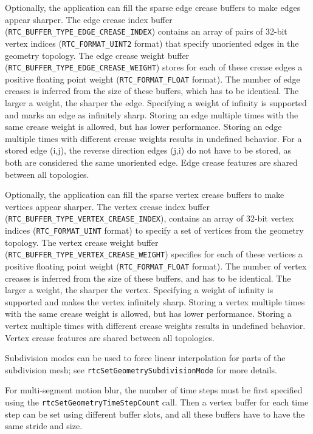 Optionally, the application can fill the sparse edge crease buffers to
make edges appear sharper. The edge crease index buffer
(\texttt{RTC\_BUFFER\_TYPE\_EDGE\_CREASE\_INDEX}) contains an array of
pairs of 32-bit vertex indices (\texttt{RTC\_FORMAT\_UINT2} format) that
specify unoriented edges in the geometry topology. The edge crease
weight buffer (\texttt{RTC\_BUFFER\_TYPE\_EDGE\_CREASE\_WEIGHT}) stores
for each of these crease edges a positive floating point weight
(\texttt{RTC\_FORMAT\_FLOAT} format). The number of edge creases is
inferred from the size of these buffers, which has to be identical. The
larger a weight, the sharper the edge. Specifying a weight of infinity
is supported and marks an edge as infinitely sharp. Storing an edge
multiple times with the same crease weight is allowed, but has lower
performance. Storing an edge multiple times with different crease
weights results in undefined behavior. For a stored edge (i,j), the
reverse direction edges (j,i) do not have to be stored, as both are
considered the same unoriented edge. Edge crease features are shared
between all topologies.

Optionally, the application can fill the sparse vertex crease buffers to
make vertices appear sharper. The vertex crease index buffer
(\texttt{RTC\_BUFFER\_TYPE\_VERTEX\_CREASE\_INDEX}), contains an array
of 32-bit vertex indices (\texttt{RTC\_FORMAT\_UINT} format) to specify
a set of vertices from the geometry topology. The vertex crease weight
buffer (\texttt{RTC\_BUFFER\_TYPE\_VERTEX\_CREASE\_WEIGHT}) specifies
for each of these vertices a positive floating point weight
(\texttt{RTC\_FORMAT\_FLOAT} format). The number of vertex creases is
inferred from the size of these buffers, and has to be identical. The
larger a weight, the sharper the vertex. Specifying a weight of infinity
is supported and makes the vertex infinitely sharp. Storing a vertex
multiple times with the same crease weight is allowed, but has lower
performance. Storing a vertex multiple times with different crease
weights results in undefined behavior. Vertex crease features are shared
between all topologies.

Subdivision modes can be used to force linear interpolation for parts of
the subdivision mesh; see \texttt{rtcSetGeometrySubdivisionMode} for
more details.

For multi-segment motion blur, the number of time steps must be first
specified using the \texttt{rtcSetGeometryTimeStepCount} call. Then a
vertex buffer for each time step can be set using different buffer
slots, and all these buffers have to have the same stride and size.

